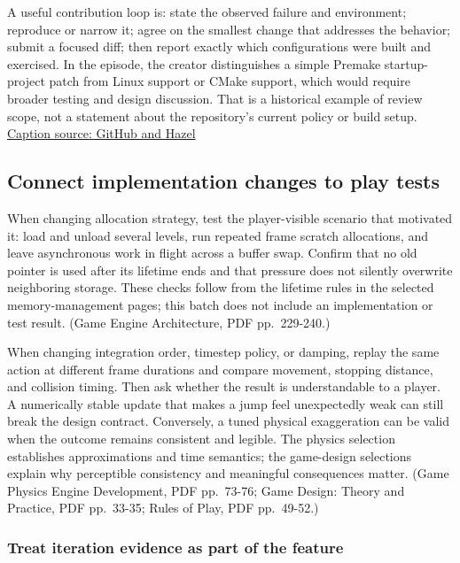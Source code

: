 A useful contribution loop is: state the observed failure and environment; reproduce or narrow it; agree on the smallest change that addresses the behavior; submit a focused diff; then report exactly which configurations were built and exercised. In the episode, the creator distinguishes a simple Premake startup-project patch from Linux support or CMake support, which would require broader testing and design discussion. That is a historical example of review scope, not a statement about the repository's current policy or build setup. \href{https://www.youtube.com/watch?v=DJEprZioFmU}{Caption source: GitHub and Hazel}

\subsection{Connect implementation changes to play tests}\label{06-engine-ii-ch040-connect-implementation-changes-to-play-tests}

When changing allocation strategy, test the player-visible scenario that motivated it: load and unload several levels, run repeated frame scratch allocations, and leave asynchronous work in flight across a buffer swap. Confirm that no old pointer is used after its lifetime ends and that pressure does not silently overwrite neighboring storage. These checks follow from the lifetime rules in the selected memory-management pages; this batch does not include an implementation or test result. (Game Engine Architecture, PDF pp.~229-240.)

When changing integration order, timestep policy, or damping, replay the same action at different frame durations and compare movement, stopping distance, and collision timing. Then ask whether the result is understandable to a player. A numerically stable update that makes a jump feel unexpectedly weak can still break the design contract. Conversely, a tuned physical exaggeration can be valid when the outcome remains consistent and legible. The physics selection establishes approximations and time semantics; the game-design selections explain why perceptible consistency and meaningful consequences matter. (Game Physics Engine Development, PDF pp.~73-76; Game Design: Theory and Practice, PDF pp.~33-35; Rules of Play, PDF pp.~49-52.)

\subsubsection{Treat iteration evidence as part of the feature}\label{06-engine-ii-ch040-treat-iteration-evidence-as-part-of-the-feature}

